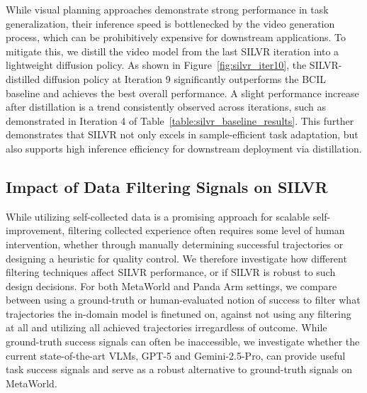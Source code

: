 While visual planning approaches demonstrate strong performance in task generalization, their inference speed is bottlenecked by the video generation process, which can be prohibitively expensive for downstream applications. To mitigate this, we distill the video model from the last SILVR iteration into a lightweight diffusion policy. As shown in Figure~\ref{fig:silvr_iter10}, the SILVR-distilled diffusion policy at Iteration 9 significantly outperforms the BCIL baseline and achieves the best overall performance. A slight performance increase after distillation is a trend consistently observed across iterations, such as demonstrated in Iteration 4 of Table~\ref{table:silvr_baseline_results}.  This further demonstrates that SILVR not only excels in sample-efficient task adaptation, but also supports high inference efficiency for downstream deployment via distillation.

\subsection{Impact of Data Filtering Signals on SILVR}
\label{sec:filtering_signal_silvr}
\vspace{-0.5em}
While utilizing self-collected data is a promising approach for scalable self-improvement, filtering collected experience often requires some level of human intervention, whether through manually determining successful trajectories or designing a heuristic for quality control.  We therefore investigate how different filtering techniques affect SILVR performance, or if SILVR is robust to such design decisions.  For both MetaWorld and Panda Arm settings, we compare between using a ground-truth or human-evaluated notion of success to filter what trajectories the in-domain model is finetuned on, against not using any filtering at all and utilizing all achieved trajectories irregardless of outcome. While ground-truth success signals can often be inaccessible, we investigate whether the current state-of-the-art VLMs, GPT-5 and Gemini-2.5-Pro, can provide useful task success signals and serve as a robust alternative to ground-truth signals on MetaWorld.

